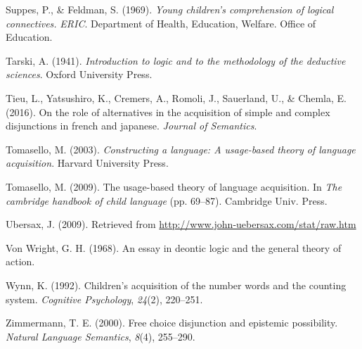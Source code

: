 \documentclass[oneside]{report}
\theoremstyle{definition}
\theoremstyle{definition}
\theoremstyle{definition}
\theoremstyle{remark}
\begin{document}
\hypertarget{ref-suppes1969young}{}
Suppes, P., \& Feldman, S. (1969). \emph{Young children's comprehension
of logical connectives.} \emph{ERIC}. Department of Health, Education,
Welfare. Office of Education.

\hypertarget{ref-tarski1941logic}{}
Tarski, A. (1941). \emph{Introduction to logic and to the methodology of
the deductive sciences}. Oxford University Press.

\hypertarget{ref-tieu2016}{}
Tieu, L., Yatsushiro, K., Cremers, A., Romoli, J., Sauerland, U., \&
Chemla, E. (2016). On the role of alternatives in the acquisition of
simple and complex disjunctions in french and japanese. \emph{Journal of
Semantics}.

\hypertarget{ref-tomasello2003constructing}{}
Tomasello, M. (2003). \emph{Constructing a language: A usage-based
theory of language acquisition}. Harvard University Press.

\hypertarget{ref-tomasello2009usage}{}
Tomasello, M. (2009). The usage-based theory of language acquisition. In
\emph{The cambridge handbook of child language} (pp. 69--87). Cambridge
Univ. Press.

\hypertarget{ref-ubersax2009}{}
Ubersax, J. (2009). Retrieved from
\url{http://www.john-uebersax.com/stat/raw.htm}

\hypertarget{ref-von1968essay}{}
Von Wright, G. H. (1968). An essay in deontic logic and the general
theory of action.

\hypertarget{ref-wynn1992children}{}
Wynn, K. (1992). Children's acquisition of the number words and the
counting system. \emph{Cognitive Psychology}, \emph{24}(2), 220--251.

\hypertarget{ref-zimmermann2000free}{}
Zimmermann, T. E. (2000). Free choice disjunction and epistemic
possibility. \emph{Natural Language Semantics}, \emph{8}(4), 255--290.


\end{document}
